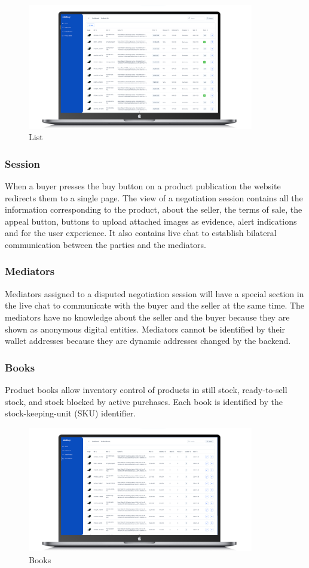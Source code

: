 \documentclass[12pt]{article}
\begin{document}
\begin{figure}[ht]
  \centering
  \includegraphics[width=0.88\textwidth, keepaspectratio]{product-list.png}
  \caption{List}
  \label{fig:web}
\end{figure}

\subsubsection { Session } 

When a buyer presses the buy button on a product publication the website redirects them to a single page. The view of a negotiation session contains all the information corresponding to the product, about the seller, the terms of sale, the appeal button, buttons to upload attached images as evidence, alert indications and for the user experience. It also contains live chat to establish bilateral communication between the parties and the mediators.

\subsubsection { Mediators } 

Mediators assigned to a disputed negotiation session will have a special section in the live chat to communicate with the buyer and the seller at the same time. The mediators have no knowledge about the seller and the buyer because they are shown as anonymous digital entities. Mediators cannot be identified by their wallet addresses because they are dynamic addresses changed by the backend.

\subsubsection { Books } 

Product books allow inventory control of products in still stock, ready-to-sell stock, and stock blocked by active purchases. Each book is identified by the stock-keeping-unit (SKU) identifier.

\begin{figure}[ht]
  \centering
  \includegraphics[width=0.88\textwidth, keepaspectratio]{product-books.png}
  \caption{Books}
  \label{fig:web}
\end{figure}
\end{document}
